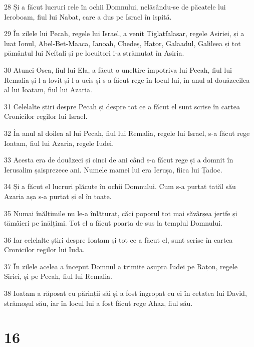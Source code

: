 \par 28 Și a făcut lucruri rele în ochii Domnului, nelăsându-se de păcatele lui Ieroboam, fiul lui Nabat, care a dus pe Israel în ispită.
\par 29 În zilele lui Pecah, regele lui Israel, a venit Tiglatfalasar, regele Asiriei, și a luat Ionul, Abel-Bet-Maaca, Ianoah, Chedeș, Hațor, Galaadul, Galileea și tot pământul lui Neftali și pe locuitori i-a strămutat în Asiria.
\par 30 Atunci Osea, fiul lui Ela, a făcut o uneltire împotriva lui Pecah, fiul lui Remalia și l-a lovit și l-a ucis și s-a făcut rege în locul lui, în anul al douăzecilea al lui Ioatam, fiul lui Azaria.
\par 31 Celelalte știri despre Pecah și despre tot ce a făcut el sunt scrise în cartea Cronicilor regilor lui Israel.
\par 32 În anul al doilea al lui Pecah, fiul lui Remalia, regele lui Israel, s-a făcut rege Ioatam, fiul lui Azaria, regele Iudei.
\par 33 Acesta era de douăzeci și cinci de ani când s-a făcut rege și a domnit în Ierusalim șaisprezece ani. Numele mamei lui era Ierușa, fiica lui Țadoc.
\par 34 Și a făcut el lucruri plăcute în ochii Domnului. Cum s-a purtat tatăl său Azaria așa s-a purtat și el în toate.
\par 35 Numai înălțimile nu le-a înlăturat, căci poporul tot mai săvârșea jertfe și tămâieri pe înălțimi. Tot el a făcut poarta de sus la templul Domnului.
\par 36 Iar celelalte știri despre Ioatam și tot ce a făcut el, sunt scrise în cartea Cronicilor regilor lui Iuda.
\par 37 În zilele acelea a început Domnul a trimite asupra Iudei pe Rațon, regele Siriei, și pe Pecah, fiul lui Remalia.
\par 38 Ioatam a răposat cu părinții săi și a fost îngropat cu ei în cetatea lui David, strămoșul său, iar în locul lui a fost făcut rege Ahaz, fiul său.

\chapter{16}

